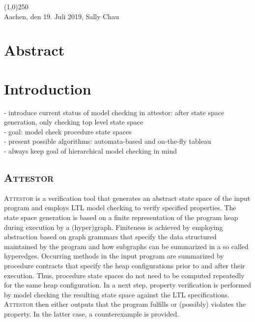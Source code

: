\documentclass[a4paper, 12pt, twoside]{report}
\begin{document}
	\noindent\line(1,0){250}\\
	Aachen, den 19. Juli 2019, Sally Chau
	
	\clearpage\mbox{}\clearpage
	
	\chapter*{Abstract}
	
	\clearpage\mbox{}\clearpage
	
	\doublespacing
	\tableofcontents
	\singlespacing
	\clearpage\mbox{}\clearpage
	\thispagestyle{empty} 
	
	\pagestyle{fancy}
	\fancyhead[RE]{\nouppercase\leftmark}
	\fancyhead[LO]{\nouppercase\rightmark}
	\fancyhead[LE,RO]{\thepage}
	\cfoot{}
	
	
	\chapter{Introduction}
	- introduce current status of model checking in attestor: after state space generation, only checking top level state space\\
	- goal: model check procedure state spaces \\
	- present possible algorithms: automata-based and on-the-fly tableau\\
	- always keep goal of hierarchical model checking in mind
	
	
	\section{\textsc{Attestor}}\label{sec:attestor}
	
	\textsc{Attestor} is a verification tool that generates an abstract state space of the input program and employs LTL model checking to verify specified properties. The state space generation is based on a finite representation of the program heap during execution by a (hyper)graph. Finiteness is achieved by employing abstraction based on graph grammars that specify the data structured maintained by the program and how subgraphs can be summarized in a so called hyperedges. Occurring methods in the input program are summarized by procedure contracts that specify the heap configurations prior to and after their execution. Thus, procedure state spaces do not need to be computed repeatedly for the same heap configuration. In a next step, property verification is performed by model checking the resulting state space against the LTL specifications. \textsc{Attestor} then either outputs that the program fulfills or (possibly) violates the property. In the latter case, a counterexample is provided.\\
	
\end{document}
